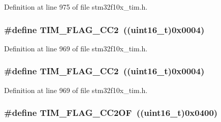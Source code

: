 Definition at line 975 of file stm32f10x\+\_\+tim.\+h.

\subsubsection[{\texorpdfstring{T\+I\+M\+\_\+\+F\+L\+A\+G\+\_\+\+C\+C2}{TIM_FLAG_CC2}}]{\setlength{\rightskip}{0pt plus 5cm}\#define T\+I\+M\+\_\+\+F\+L\+A\+G\+\_\+\+C\+C2~(({\bf uint16\+\_\+t})0x0004)}\hypertarget{group___t_i_m___flags_ga9cae242f1c51b31839ffc5bc007c82a7}{}\label{group___t_i_m___flags_ga9cae242f1c51b31839ffc5bc007c82a7}


Definition at line 969 of file stm32f10x\+\_\+tim.\+h.

\subsubsection[{\texorpdfstring{T\+I\+M\+\_\+\+F\+L\+A\+G\+\_\+\+C\+C2}{TIM_FLAG_CC2}}]{\setlength{\rightskip}{0pt plus 5cm}\#define T\+I\+M\+\_\+\+F\+L\+A\+G\+\_\+\+C\+C2~(({\bf uint16\+\_\+t})0x0004)}\hypertarget{group___t_i_m___flags_ga9cae242f1c51b31839ffc5bc007c82a7}{}\label{group___t_i_m___flags_ga9cae242f1c51b31839ffc5bc007c82a7}


Definition at line 969 of file stm32f10x\+\_\+tim.\+h.

\subsubsection[{\texorpdfstring{T\+I\+M\+\_\+\+F\+L\+A\+G\+\_\+\+C\+C2\+OF}{TIM_FLAG_CC2OF}}]{\setlength{\rightskip}{0pt plus 5cm}\#define T\+I\+M\+\_\+\+F\+L\+A\+G\+\_\+\+C\+C2\+OF~(({\bf uint16\+\_\+t})0x0400)}\hypertarget{group___t_i_m___flags_ga4df0c71d3e695c214d49802942e04590}{}\label{group___t_i_m___flags_ga4df0c71d3e695c214d49802942e04590}


